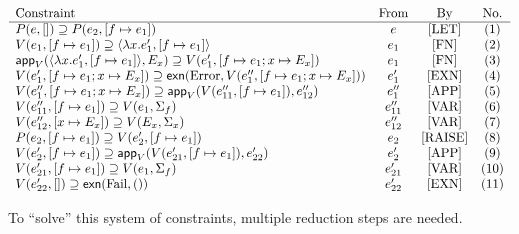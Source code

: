 \documentclass{article}
\begin{document}
\[
\begin{array}{l c c c}
  \text{Constraint} & \text{From} & \text{By} & \text{No.}\\
  \hline
  P(e, []) \supseteq P(e_{2},[f\mapsto e_{1}]) & e & \text{[LET]} & (1)\\
  V(e_{1},[f\mapsto e_{1}]) \supseteq \langle \lambda x.e_{1}' , [f \mapsto e_{1}]\rangle & e_{1} & \text{[FN]} & (2)\\
  \mathsf{app}_{V}(\langle \lambda x.e_{1}' , [f \mapsto e_{1}]\rangle, E_{x}) \supseteq V(e_{1}',[f \mapsto e_{1};x \mapsto E_{x}]) & e_{1} & \text{[FN]} & (3)\\
  V(e_{1}',[f \mapsto e_{1};x \mapsto E_{x}]) \supseteq \mathsf{exn}(\text{Error},V(e_{1}'', [f \mapsto e_{1};x \mapsto E_{x}])) & e_{1}' & \text{[EXN]} & (4)\\
  V(e_{1}'',[f \mapsto e_{1};x \mapsto E_{x}]) \supseteq \mathsf{app}_{V}(V(e_{11}'', [f \mapsto e_{1}]), e_{12}'') & e_{1}'' & \text{[APP]} & (5)\\
  V(e_{11}'', [f \mapsto e_{1}]) \supseteq V(e_{1},\Sigma_{f}) & e_{11}'' & \text{[VAR]} & (6)\\
  V(e_{12}'', [x \mapsto E_{x}]) \supseteq V(E_{x},\Sigma_{x}) & e_{12}'' & \text{[VAR]} & (7)\\
  P(e_{2},[f \mapsto e_{1}]) \supseteq V(e_{2}',[f \mapsto e_{1}]) & e_{2} & \text{[RAISE]} & (8)\\
  V(e_{2}', [f \mapsto e_{1}]) \supseteq \mathsf{app}_{V}(V(e_{21}', [f \mapsto e_{1}]), e_{22}') & e_{2}' & \text{[APP]} & (9)\\
  V(e_{21}', [f \mapsto e_{1}]) \supseteq V(e_{1},\Sigma_{f}) & e_{21}' & \text{[VAR]} & (10)\\
  V(e_{22}', []) \supseteq \mathsf{exn}(\text{Fail}, ()) & e_{22}' & \text{[EXN]} & (11)
\end{array}
\]

To ``solve'' this system of constraints, multiple reduction steps are needed.
\end{document}
